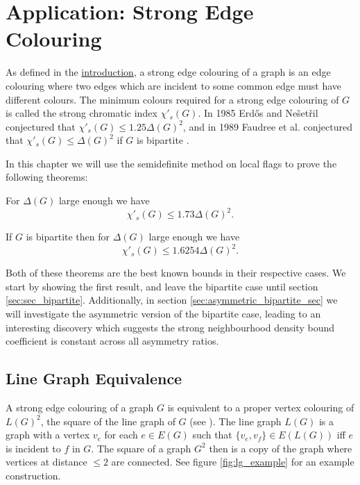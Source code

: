 \chapter{Application: Strong Edge Colouring}
\label{chap:strong_edge_colouring}

As defined in the \hyperref[sec:intro_strong_edge_coloring]{introduction},
a strong edge colouring of a graph is an edge colouring where two edges which are incident to some
common edge must have different colours. The minimum colours required for a strong edge colouring of
$G$ is called the strong chromatic index $\chi'_s(G)$.
In 1985 Erd\H{o}s and Nešetřil conjectured that
$\chi'_s(G) \leq 1.25\Delta(G)^2$, and in 1989 Faudree et al. conjectured that
$\chi'_s(G) \leq \Delta(G)^2$ if $G$ is bipartite \cite{faudreeInducedMatchingsBipartite1989}.

In this chapter we will use the semidefinite method on local flags to prove the following
theorems:
\begin{knowntheorem}
    For $\Delta(G)$ large enough we have
    \[\chi'_s(G) \leq 1.73\Delta(G)^2.\]
\end{knowntheorem}
\begin{knowntheorem}
    If $G$ is bipartite then for $\Delta(G)$ large enough we have
    \[\chi'_s(G) \leq 1.6254\Delta(G)^2.\]
\end{knowntheorem}
Both of these theorems are the best known bounds in their respective cases. We start
by showing the first result, and leave the bipartite case until section
\ref{sec:sec_bipartite}.
Additionally, in section
\ref{sec:asymmetric_bipartite_sec} we will investigate the asymmetric version of the
bipartite case, leading to an interesting discovery which suggests the strong neighbourhood
density bound coefficient is constant across all asymmetry ratios.

\section{Line Graph Equivalence}

A strong edge colouring of a graph $G$ is equivalent to a proper vertex colouring of $L(G)^2$, the
square of the line graph of $G$ (see \cite{molloyBoundStrongChromatic1997}).
The line graph $L(G)$ is a graph with a vertex $v_e$ for
each $e\in E(G)$ such that $\{v_e, v_f\} \in E(L(G))$ iff $e$ is incident to $f$ in
$G$. The square of a graph $G^2$ then is a copy of the graph where vertices at distance $\leq 2$
are connected. See figure \ref{fig:lg_example} for an example construction.

